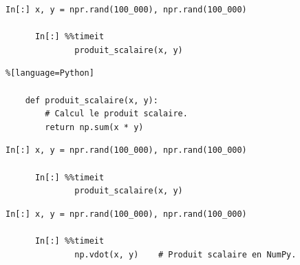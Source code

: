 \documentclass[aspectratio=169]{beamer}
\begin{document}
{
  \begin{frame}[fragile]{}{}
    \vfill
    \begin{lstlisting}[backgroundcolor=\color{white}, basicstyle=\ttfamily\footnotesize\color{black}]
      In[:] x, y = npr.rand(100_000), npr.rand(100_000)
    
      In[:] %%timeit
              produit_scalaire(x, y)
    \end{lstlisting}
    \hspace{1cm}
    \footnotesize{\texttt{}}
    
    \vfill
  \end{frame}
}


\begin{frame}[fragile]{}{}
  \vfill
  \begin{lstlisting}%[language=Python]

    def produit_scalaire(x, y):
        # Calcul le produit scalaire.
        return np.sum(x * y)
  \end{lstlisting}
  \vfill
\end{frame}




{
  \begin{frame}[fragile]{}{}
    \vfill
    \begin{lstlisting}[backgroundcolor=\color{white}, basicstyle=\ttfamily\footnotesize\color{black}]
      In[:] x, y = npr.rand(100_000), npr.rand(100_000)
      
      In[:] %%timeit
              produit_scalaire(x, y)
    \end{lstlisting}
    \hspace{1cm}
    \footnotesize{\texttt{}}
    
    \vfill
  \end{frame}
}





{
  \begin{frame}[fragile]{}{}
    \vfill
    \begin{lstlisting}[backgroundcolor=\color{white}, basicstyle=\ttfamily\footnotesize\color{black}]
      In[:] x, y = npr.rand(100_000), npr.rand(100_000)
      
      In[:] %%timeit
              np.vdot(x, y)    # Produit scalaire en NumPy.
    \end{lstlisting}
    \hspace{1cm}
    \footnotesize{\texttt{}}
    
    \vfill
  \end{frame}
}
\end{document}
